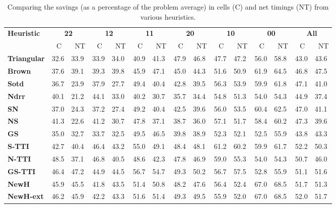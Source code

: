 \documentclass[runningheads,a4paper]{llncs}
\begin{document}
\begin{table}
\vspace*{-15pt}
\caption{Comparing the savings (as a percentage of the problem average) in cells (C) and net timings (NT) from various heuristics.}
\centering
\label{tab:PercentageSavings}
\begin{tabular}{lllllllllllllll}
\multirow{2}{*}{\textbf{Heuristic}}
& \multicolumn{2}{c}{\textbf{22}} 
& \multicolumn{2}{c}{\textbf{12}} 
& \multicolumn{2}{c}{\textbf{11}} 
& \multicolumn{2}{c}{\textbf{20}} 
& \multicolumn{2}{c}{\textbf{10}} 
& \multicolumn{2}{c}{\textbf{00}} 
& \multicolumn{2}{c}{\textbf{All}}  \\
\cmidrule(lr){2-3}
\cmidrule(lr){4-5}
\cmidrule(lr){6-7}
\cmidrule(lr){8-9}
\cmidrule(lr){10-11}
\cmidrule(lr){12-13}
\cmidrule(lr){14-15}
           & \,\, C & \, NT & \,\, C & \, NT & \,\, C & \, NT 
           & \,\, C & \, NT & \,\, C & \, NT & \,\, C & \, NT & \,\, C & \, NT \\
\midrule 
\textbf{Triangular}  & 32.6 & 33.9 & 33.9 & 34.0 & 40.9 & 41.3 & 47.9 & 46.8 & 47.7 & 47.2 & 56.0 & 58.8
   & 43.0 & 43.6 \\
\textbf{Brown}  & 37.6 & 39.1 & 39.3 & 39.8 & 45.9 & 47.1 & 45.0 & 44.3 & 51.6 & 50.9 & 61.9 & 64.5
   & 46.8 & 47.5 \\
\textbf{Sotd}  & 36.7 & 23.9 & 37.9 & 27.7 & 49.4 & 40.4 & 42.8 & 39.5 & 56.3 & 53.9 & 59.9 & 61.8
   & 47.1 & 41.0 \\
\textbf{Ndrr}  & 40.1 & 21.2 & 44.1 & 33.0 & 40.2 & 30.7 & 35.7 & 34.4 & 54.8 & 51.3 & 54.0 & 54.3 
   & 44.9 & 37.4 \\
\midrule
\textbf{SN} &37.0 & 24.3 & 37.2 & 27.4 & 49.2 & 40.4 & 42.5 & 39.6 & 56.0 & 53.5 & 60.4 & 62.5
   & 47.0 & 41.1   \\
\textbf{NS} & 41.3 & 22.6 & 41.2 & 30.7 & 47.8 & 37.1 & 38.7 & 36.0 & 57.1 & 51.7 & 58.4 & 60.2
   & 47.3 & 39.6   \\  
\midrule 
\textbf{GS} & 35.0 & 32.7 & 33.7 & 32.5 & 49.5 & 46.5 & 39.8 & 38.9 & 52.3 & 52.1 & 52.5 & 55.9 
   & 43.8 & 43.3   \\
\midrule
\textbf{S-TTI} & 42.7 & 40.4 & 46.4 & 43.2 & 55.0 & 49.1 & 48.4 & 48.1 & 61.2 & 60.2 & 59.9 & 61.7
   & 52.2 & 50.3 \\ 
\textbf{N-TTI} & 48.5 & 37.1 & 46.8 & 40.5 & 48.6 & 42.3 & 47.8 & 46.9 & 59.0 & 55.3 & 54.0 & 54.3
   & 50.7 & 46.0 \\   
\textbf{GS-TTI} & 46.4 & 47.2 & 44.9 & 44.5 & 56.7 & 54.7 & 49.3 & 50.2 & 56.7 & 57.5 & 52.8 & 55.9
   & 51.1 & 51.6 \\
\midrule
\textbf{NewH}   & 45.9 & 45.5 & 41.8 & 43.5 & 51.4 & 50.8 & 48.2 & 47.6 & 56.4 & 52.4 & 67.0 & 68.5
   & 51.7 & 51.3 \\
\textbf{NewH-ext} & 46.2 & 45.9 & 42.2 & 43.3 & 51.6 & 51.4 & 49.3 & 49.5 & 55.9 & 52.0 & 67.0 & 68.5
   & 52.0 & 51.7      
\end{tabular}
\vspace*{-30pt}
\end{table}
\end{document}
